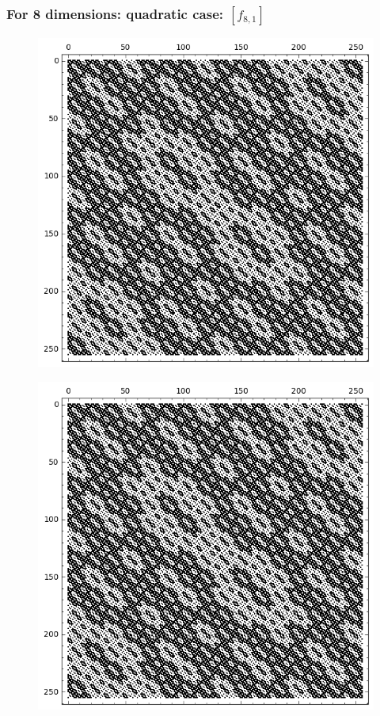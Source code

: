 \documentclass[pdf,sprung,slideColor,nocolorBG]{beamer}
\newenvironment{colortheme}[1]{
\def\ProvidesPackageRCS $##1${\relax}
\renewcommand{\ProcessOptions}{\relax}
\makeatletter

\makeatother
}{}
\begin{document}
\begin{colortheme}{jubata}
\begin{frame}
\begin{figure}
\begin{minipage}{.48\textwidth}
  \label{fig:q6_1_bent_cayley_graph_index_matrix}
\end{minipage}
\end{figure}
\end{frame}
\begin{frame}
\frametitle{For 8 dimensions: quadratic case: $[f_{8,1}]$}
\begin{figure}
\centering
\begin{minipage}{.48\textwidth}
  \centering
  \includegraphics[width=.9\linewidth]{../matrix_plot/c8_1_weight_class_matrix.png}
  \label{fig:q8_1_weight_class_matrix}
\end{minipage}%
\begin{minipage}{.48\textwidth}
  \centering
  \includegraphics[width=.9\linewidth]{../matrix_plot/c8_1_bent_cayley_graph_index_matrix.png}

\end{minipage}
\end{figure}
\end{frame}
\end{colortheme}
\end{document}

